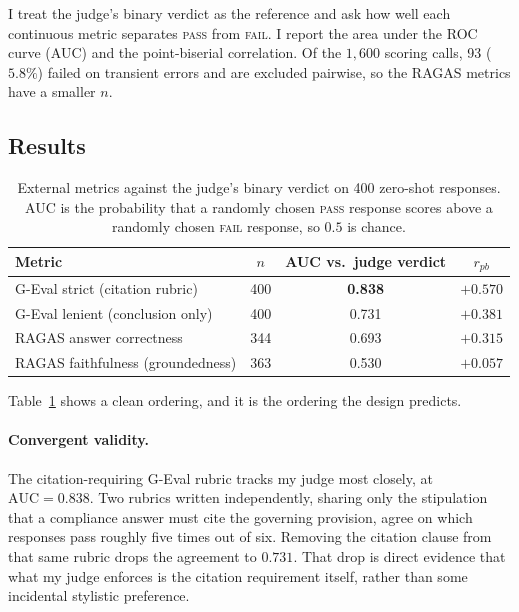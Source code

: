 I treat the judge's binary verdict as the reference and ask how well each
continuous metric separates \textsc{pass} from \textsc{fail}. I report
the area under the ROC curve (AUC) and the point-biserial correlation. Of
the $1{,}600$ scoring calls, 93 ($5.8\%$) failed on transient errors and
are excluded pairwise, so the RAGAS metrics have a smaller $n$.

\subsection{Results}

\begin{table}[htbp]
\centering
\small
\caption{External metrics against the judge's binary verdict on 400
         zero-shot responses. AUC is the probability that a randomly
         chosen \textsc{pass} response scores above a randomly chosen
         \textsc{fail} response, so $0.5$ is chance.}
\label{tab:judgeaudit}
\begin{tabular}{lccc}
\toprule
Metric & $n$ & AUC vs.\ judge verdict & $r_{pb}$ \\
\midrule
G-Eval strict (citation rubric)   & 400 & \textbf{0.838} & $+0.570$ \\
G-Eval lenient (conclusion only)  & 400 & 0.731 & $+0.381$ \\
RAGAS answer correctness          & 344 & 0.693 & $+0.315$ \\
RAGAS faithfulness (groundedness) & 363 & 0.530 & $+0.057$ \\
\bottomrule
\end{tabular}
\end{table}

Table~\ref{tab:judgeaudit} shows a clean ordering, and it is the ordering
the design predicts.

\paragraph{Convergent validity.}
The citation-requiring G-Eval rubric tracks my judge most closely, at
$\mathrm{AUC} = 0.838$. Two rubrics written independently, sharing only
the stipulation that a compliance answer must cite the governing
provision, agree on which responses pass roughly five times out of six.
Removing the citation clause from that same rubric drops the agreement to
$0.731$. That drop is direct evidence that what my judge enforces is the
citation requirement itself, rather than some incidental stylistic
preference.

